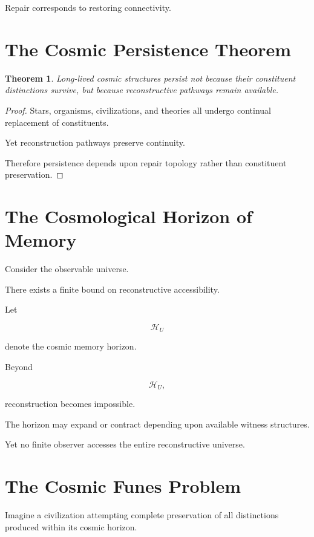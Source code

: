 \documentclass[12pt,oneside]{book}
\theoremstyle{plain} \newtheorem{theorem}{Theorem}[chapter] \newtheorem{lemma}[theorem]{Lemma} \newtheorem{proposition}[theorem]{Proposition} \newtheorem{corollary}[theorem]{Corollary}
\theoremstyle{definition} \newtheorem{definition}[theorem]{Definition} \newtheorem{axiom}[theorem]{Axiom} \newtheorem{construction}[theorem]{Construction}
\theoremstyle{remark} \newtheorem{remark}[theorem]{Remark} \newtheorem{example}[theorem]{Example}
\begin{document}
Repair corresponds to restoring connectivity.

\section{The Cosmic Persistence Theorem}

\begin{theorem}

Long-lived cosmic structures persist not because their constituent distinctions survive, but because reconstructive pathways remain available.

\end{theorem}

\begin{proof}

Stars, organisms, civilizations, and theories all undergo continual replacement of constituents.

Yet reconstruction pathways preserve continuity.

Therefore persistence depends upon repair topology rather than constituent preservation.

\end{proof}

\section{The Cosmological Horizon of Memory}

Consider the observable universe.

There exists a finite bound on reconstructive accessibility.

Let

\[
\mathcal H_U
\]

denote the cosmic memory horizon.

Beyond

\[
\mathcal H_U,
\]

reconstruction becomes impossible.

The horizon may expand or contract depending upon available witness structures.

Yet no finite observer accesses the entire reconstructive universe.

\section{The Cosmic Funes Problem}

Imagine a civilization attempting complete preservation of all distinctions produced within its cosmic horizon.
\end{document}
